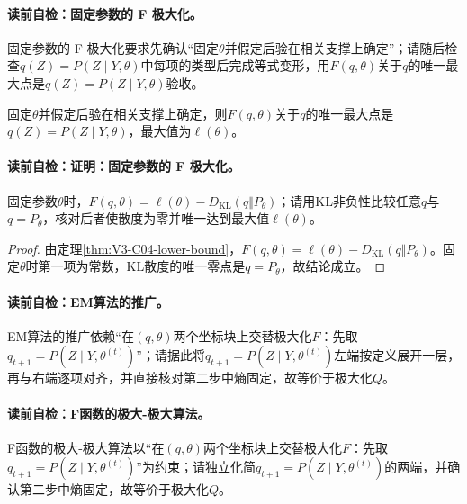 \paragraph{读前自检：固定参数的 F 极大化。}固定参数的 F 极大化要求先确认“固定$\theta$并假定后验在相关支撑上确定”；请随后检查$q(Z)=P(Z\mid Y,\theta)$中每项的类型后完成等式变形，用$F(q,\theta)$关于$q$的唯一最大点是$q(Z)=P(Z\mid Y,\theta)$验收。\par

\begin{lemma}\label{lem:V3-C04-F-posterior}
固定$\theta$并假定后验在相关支撑上确定，则$F(q,\theta)$关于$q$的唯一最大点是$q(Z)=P(Z\mid Y,\theta)$，最大值为$\ell(\theta)$。
\end{lemma}
\paragraph{读前自检：证明：固定参数的 F 极大化。}固定参数$\theta$时，$F(q,\theta)=\ell(\theta)-D_{\mathrm{KL}}(q\Vert P_\theta)$；请用KL非负性比较任意$q$与$q=P_\theta$，核对后者使散度为零并唯一达到最大值$\ell(\theta)$。\par

\begin{proof}
由定理\ref{thm:V3-C04-lower-bound}，$F(q,\theta)=\ell(\theta)-D_{\mathrm{KL}}(q\Vert P_\theta)$。固定$\theta$时第一项为常数，KL散度的唯一零点是$q=P_\theta$，故结论成立。
\end{proof}

\paragraph{读前自检：EM算法的推广。}EM算法的推广依赖“在$(q,\theta)$两个坐标块上交替极大化$F$：先取$q_{t+1}=P(Z\mid Y,\theta^{(t)})$”；请据此将$q_{t+1}=P(Z\mid Y,\theta^{(t)})$左端按定义展开一层，再与右端逐项对齐，并直接核对第二步中熵固定，故等价于极大化$Q$。\par
\paragraph{读前自检：F函数的极大-极大算法。}F函数的极大-极大算法以“在$(q,\theta)$两个坐标块上交替极大化$F$：先取$q_{t+1}=P(Z\mid Y,\theta^{(t)})$”为约束；请独立化简$q_{t+1}=P(Z\mid Y,\theta^{(t)})$的两端，并确认第二步中熵固定，故等价于极大化$Q$。\par

